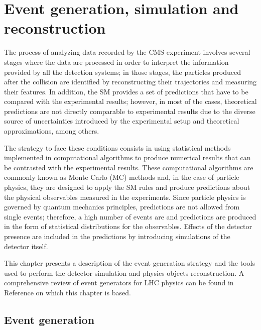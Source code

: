 \chapter{Event generation, simulation and reconstruction}\label{ch:gensimreco}

The process of analyzing data recorded by the CMS experiment involves several stages where the data are processed in order to interpret the information provided by all the detection systems; in those stages, the particles produced after the \pp collision are identified by reconstructing their trajectories and measuring their features. In addition, the SM provides a set of predictions that have to be compared with the experimental results; however, in most of the cases, theoretical predictions are not directly comparable to experimental results due to the diverse source of uncertainties introduced by the experimental setup and theoretical approximations, among others.

The strategy to face these conditions consists in using statistical methods implemented in computational algorithms to produce numerical results that can be contrasted with the experimental results. These computational algorithms are commonly known as Monte Carlo (MC) methods and, in the case of particle physics, they are designed to apply the SM rules and produce predictions about the physical observables measured in the experiments. Since particle physics is governed by quantum mechanics principles, predictions are not allowed from single events; therefore, a high number of events are  and predictions are produced in the form of statistical distributions for the observables. Effects of the detector presence are included in the predictions by introducing simulations of the detector itself.     

This chapter presents a description of the event generation strategy and the tools used to perform the detector simulation and physics objects reconstruction. A comprehensive review of event generators for LHC physics can be found in Reference \cite{gen} on which this chapter is based.  

\section{Event generation}\label{sec:event_generation}

